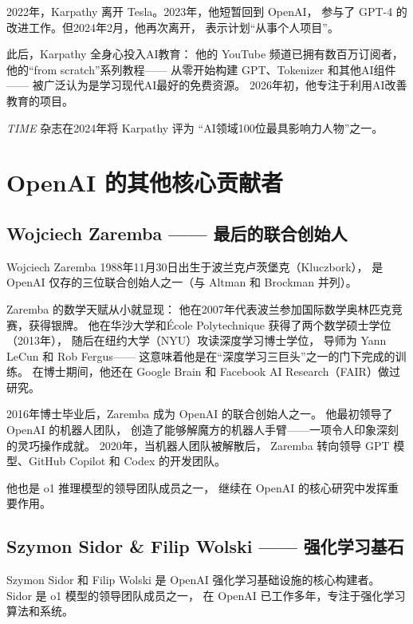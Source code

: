 2022年，Karpathy 离开 Tesla。2023年，他短暂回到 OpenAI，
参与了 GPT-4 的改进工作。但2024年2月，他再次离开，
表示计划``从事个人项目''。

此后，Karpathy 全身心投入AI教育：
他的 YouTube 频道已拥有数百万订阅者，
他的``from scratch''系列教程——
从零开始构建 GPT、Tokenizer 和其他AI组件——
被广泛认为是学习现代AI最好的免费资源。
2026年初，他专注于利用AI改善教育的项目。

\emph{TIME} 杂志在2024年将 Karpathy 评为
``AI领域100位最具影响力人物''之一。


\section{OpenAI 的其他核心贡献者}
\label{sec:openai-others}

\subsection{Wojciech Zaremba —— 最后的联合创始人}
\label{subsec:wojciech-zaremba}

Wojciech Zaremba 1988年11月30日出生于波兰克卢茨堡克（Kluczbork），
是 OpenAI 仅存的三位联合创始人之一（与 Altman 和 Brockman 并列）。

Zaremba 的数学天赋从小就显现：
他在2007年代表波兰参加国际数学奥林匹克竞赛，获得银牌。
他在华沙大学和\'{E}cole Polytechnique 获得了两个数学硕士学位（2013年），
随后在纽约大学（NYU）攻读深度学习博士学位，
导师为 Yann LeCun 和 Rob Fergus——
这意味着他是在``深度学习三巨头''之一的门下完成的训练。
在博士期间，他还在 Google Brain 和 Facebook AI Research（FAIR）做过研究。

2016年博士毕业后，Zaremba 成为 OpenAI 的联合创始人之一。
他最初领导了 OpenAI 的机器人团队，
创造了能够解魔方的机器人手臂——一项令人印象深刻的灵巧操作成就。
2020年，当机器人团队被解散后，
Zaremba 转向领导 GPT 模型、GitHub Copilot 和 Codex 的开发团队。

他也是 o1 推理模型的领导团队成员之一，
继续在 OpenAI 的核心研究中发挥重要作用。


\subsection{Szymon Sidor \& Filip Wolski —— 强化学习基石}
\label{subsec:sidor-wolski}

Szymon Sidor 和 Filip Wolski 是 OpenAI 强化学习基础设施的核心构建者。
Sidor 是 o1 模型的领导团队成员之一，
在 OpenAI 已工作多年，专注于强化学习算法和系统。

